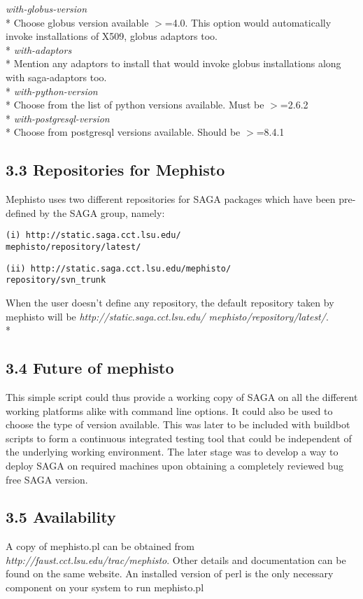 \documentclass[a4paper,10pt]{article}
\begin{document}
\begin{multicols}{2}
\emph{with-globus-version} \\*
 Choose globus version available $>$=4.0. This option would automatically 
 invoke installations of X509, globus adaptors too. \\*
\emph{with-adaptors}\\*
 Mention any adaptors to install that would invoke globus installations along with 
 saga-adaptors too. \\*
 \emph{with-python-version}\\*
 Choose from the list of python versions available. Must be 
 $>$=2.6.2 \\*
 \emph{with-postgresql-version}\\*
 Choose from postgresql versions available. Should be $>$=8.4.1
\subsection*{\normalsize 3.3 Repositories for Mephisto} 
Mephisto uses two different repositories for SAGA packages which have been
pre-defined by the SAGA group, namely: 
\begin{verbatim}
(i) http://static.saga.cct.lsu.edu/
mephisto/repository/latest/
\end{verbatim}
\begin{verbatim}
(ii) http://static.saga.cct.lsu.edu/mephisto/
repository/svn_trunk
\end{verbatim}
When the user doesn't define any repository, the default 
repository taken by mephisto will be \emph {http://static.saga.cct.lsu.edu/
mephisto/repository/latest/}. \\*
\subsection*{\normalsize 3.4 Future of mephisto}
This simple script could thus provide a working copy of SAGA on all the different working platforms alike 
with command line options. It could also be used to choose the type of version available. This was later
to be included with buildbot scripts to form a continuous integrated testing tool that
could be independent of the underlying working environment. The later stage was to develop a way to deploy SAGA 
on required machines upon obtaining a completely reviewed bug free SAGA version. 
\subsection*{\normalsize 3.5 Availability}
A copy of mephisto.pl can be obtained from \emph{http://faust.cct.lsu.edu/trac/mephisto}. 
Other details and documentation can be found on the same website. 
An installed version of perl is the only necessary component on your system to run mephisto.pl 

\end{multicols}
\end{document}
